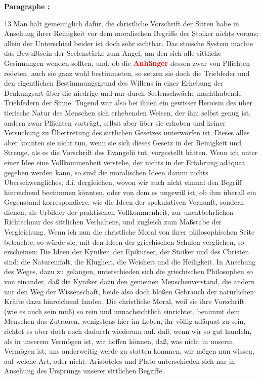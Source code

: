 \documentclass[a4paper,12pt,twoside]{book}
\newcommand{\match}[1]{\textcolor{red}{\textbf{#1}}}
\begin{document}
	\textbf{Paragraphe : }
	
	13 Man hält gemeiniglich dafür, die christliche Vorschrift der Sitten habe in Ansehung ihrer Reinigkeit vor dem moralischen Begriffe der Stoiker nichts voraus; allein der Unterschied beider ist doch sehr sichtbar. Das stoische System machte das Bewußtsein der Seelenstärke zum Angel, um den sich alle sittliche Gesinnungen wenden sollten, und, ob die \match{Anhänger} dessen zwar von Pflichten redeten, auch sie ganz wohl bestimmeten, so setzen sie doch die Triebfeder und den eigentlichen Bestimmungsgrund des Willens in einer Erhebung der Denkungsart über die niedrige und nur durch Seelenschwäche machthabende Triebfedern der Sinne. Tugend war also bei ihnen ein gewisser Heroism des über tierische Natur des Menschen sich erhebenden Weisen, der ihm selbst genug ist, andern zwar Pflichten vorträgt, selbst aber über sie erhoben und keiner Versuchung zu Übertretung des sittlichen Gesetzes unterworfen ist. Dieses alles aber konnten sie nicht tun, wenn sie sich dieses Gesetz in der Reinigkeit und Strenge, als es die Vorschrift des Evangelii tut, vorgestellt hätten. Wenn ich unter einer Idee eine Vollkommenheit verstehe, der nichts in der Erfahrung adäquat gegeben werden kann, so sind die moralischen Ideen darum nichts Überschwengliches, d.i. dergleichen, wovon wir auch nicht einmal den Begriff hinreichend bestimmen könnten, oder von dem es ungewiß ist, ob ihm überall ein Gegenstand korrespondiere, wie die Ideen der spekulativen Vernunft, sondern dienen, als Urbilder der praktischen Vollkommenheit, zur unentbehrlichen Richtschnur des sittlichen Verhaltens, und zugleich zum Maßstabe der Vergleichung. Wenn ich nun die christliche Moral von ihrer philosophischen Seite betrachte, so würde sie, mit den Ideen der griechischen Schulen verglichen, so erscheinen: Die Ideen der Kyniker, der Epikureer, der Stoiker und des Christen sind: die Natureinfalt, die Klugheit, die Weisheit und die Heiligkeit. In Ansehung des Weges, dazu zu gelangen, unterschieden sich die griechischen Philosophen so von einander, daß die Kyniker dazu den gemeinen Menschenverstand, die andern nur den Weg der Wissenschaft, beide also doch bloßen Gebrauch der natürlichen Kräfte dazu hinreichend fanden. Die christliche Moral, weil sie ihre Vorschrift (wie es auch sein muß) so rein und unnachsichtlich einrichtet, benimmt dem Menschen das Zutrauen, wenigstens hier im Leben, ihr völlig adäquat zu sein, richtet es aber doch auch dadurch wiederum auf, daß, wenn wir so gut handeln, als in unserem Vermögen ist, wir hoffen können, daß, was nicht in unserm Vermögen ist, uns anderweitig werde zu statten kommen, wir mögen nun wissen, auf welche Art, oder nicht. Aristoteles und Plato unterschieden sich nur in Ansehung des Ursprungs unserer sittlichen Begriffe. 
	
\end{document}
